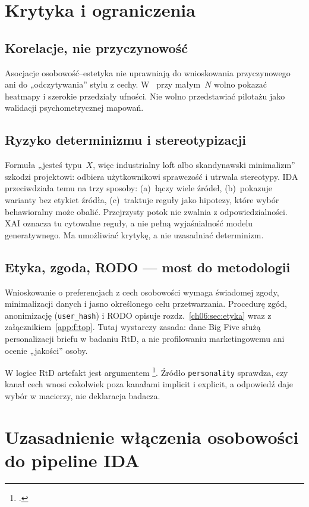 \section{Krytyka i ograniczenia}
\label{ch05:sec:krytyka}

\subsection{Korelacje, nie przyczynowość}
Asocjacje osobowość--estetyka nie uprawniają do wnioskowania przyczynowego ani do „odczytywania” stylu z cechy.
W~ przy małym~$N$ wolno pokazać heatmapy i szerokie przedziały ufności. Nie wolno przedstawiać pilotażu jako walidacji psychometrycznej mapowań.

\subsection{Ryzyko determinizmu i stereotypizacji}
Formuła „jesteś typu~$X$, więc industrialny loft albo skandynawski minimalizm” szkodzi projektowi: odbiera użytkownikowi sprawczość i utrwala stereotypy.
IDA przeciwdziała temu na trzy sposoby: (a)~łączy wiele źródeł, (b)~pokazuje warianty bez etykiet źródła, (c)~traktuje reguły jako hipotezy, które wybór behawioralny może obalić.
Przejrzysty potok nie zwalnia z odpowiedzialności. XAI oznacza tu cytowalne reguły, a nie pełną wyjaśnialność modelu generatywnego. Ma umożliwiać krytykę, a nie uzasadniać determinizm.

\subsection{Etyka, zgoda, RODO --- most do metodologii}
Wnioskowanie o preferencjach z cech osobowości wymaga świadomej zgody, minimalizacji danych i jasno określonego celu przetwarzania.
Procedurę zgód, anonimizację (\texttt{user\_hash}) i RODO opisuje rozdz.~\ref{ch06:sec:etyka} wraz z załącznikiem~\ref{app:f:top}. Tutaj wystarczy zasada: dane Big Five służą personalizacji briefu w badaniu RtD, a nie profilowaniu marketingowemu ani ocenie „jakości” osoby.

W logice RtD artefakt jest argumentem \footcite{zimmerman2007rtd}. Źródło \texttt{personality} sprawdza, czy kanał cech wnosi cokolwiek poza kanałami implicit i explicit, a odpowiedź daje wybór w macierzy, nie deklaracja badacza.

\section{Uzasadnienie włączenia osobowości do pipeline IDA}
\label{ch05:sec:uzasadnienie}

